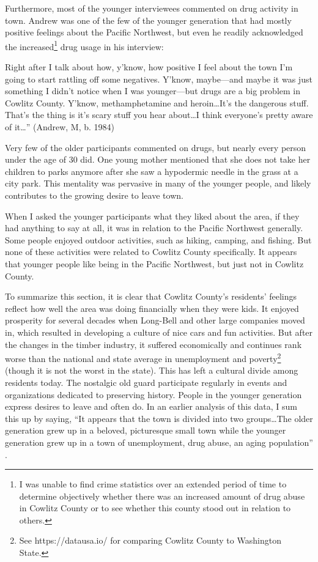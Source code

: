 Furthermore, most of the younger interviewees commented on drug activity in town. Andrew was one of the few of the younger generation that had mostly positive feelings about the Pacific Northwest, but even he readily acknowledged the increased\footnote{I was unable to find crime statistics over an extended period of time to determine objectively whether there was an increased amount of drug abuse in Cowlitz County or to see whether this county stood out in relation to others.} drug usage in his interview:
\begin{num_quote}
    Right after I talk about how, y'know, how positive I feel about the town I'm going to start rattling off some negatives. Y'know, maybe—and maybe it was just something I didn't notice when I was younger—but drugs are a big problem in Cowlitz County. Y'know, methamphetamine and heroin\ldots It's the dangerous stuff. That's the thing is it's scary stuff you hear about\ldots I think everyone's pretty aware of it\ldots'' (Andrew, M, b. 1984)
    \label{quote:drugs}
\end{num_quote}
Very few of the older participants commented on drugs, but nearly every person under the age of 30 did. One young mother mentioned that she does not take her children to parks anymore after she saw a hypodermic needle in the grass at a city park. This mentality was pervasive in many of the younger people, and likely contributes to the growing desire to leave town.

When I asked the younger participants what they liked about the area, if they had anything to say at all, it was in relation to the Pacific Northwest generally. Some people enjoyed outdoor activities, such as hiking, camping, and fishing. But none of these activities were related to Cowlitz County specifically. It appears that younger people like being in the Pacific Northwest, but just not in Cowlitz County.

To summarize this section, it is clear that Cowlitz County's residents' feelings reflect how well the area was doing financially when they were kids. It enjoyed prosperity for several decades when Long-Bell and other large companies moved in, which resulted in developing a culture of nice cars and fun activities. But after the changes in the timber industry, it suffered economically and continues rank worse than the national and state average in unemployment and poverty\footnote{See https://datausa.io/ for comparing Cowlitz County to Washington State.} (though it is not the worst in the state). This has left a cultural divide among residents today. The nostalgic old guard participate regularly in events and organizations dedicated to preserving history. People in the younger generation express desires to leave and often do. In an earlier analysis of this data, I sum this up by saying, ``It appears that the town is divided into two groups\ldots The older generation grew up in a beloved, picturesque small town while the younger generation grew up in a town of unemployment, drug abuse, an aging population'' \citep[144]{stanley_2018_pwpl}.

